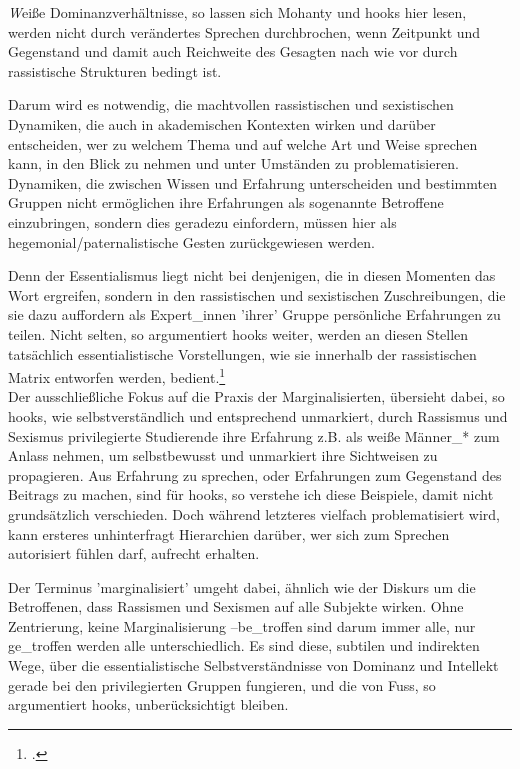 \textit{W}eiße Dominanzverhältnisse, so lassen sich Mohanty und hooks hier lesen, werden
nicht durch verändertes Sprechen durchbrochen, wenn Zeitpunkt und Gegenstand
und damit auch Reichweite des Gesagten nach wie vor durch rassistische
Strukturen bedingt ist.

Darum wird es notwendig, die machtvollen rassistischen und sexistischen
Dynamiken, die auch in akademischen Kontexten wirken und darüber entscheiden,
wer zu welchem Thema und auf welche Art und Weise sprechen kann, in den Blick
zu nehmen und unter Umständen zu problematisieren. Dynamiken, die zwischen
Wissen und Erfahrung unterscheiden und bestimmten Gruppen nicht ermöglichen
ihre Erfahrungen als sogenannte Betroffene einzubringen, sondern dies geradezu
einfordern, müssen hier als hegemonial/paternalistische Gesten zurückgewiesen
werden.

Denn der Essentialismus liegt nicht bei denjenigen, die in diesen Momenten das
Wort ergreifen, sondern in den rassistischen und sexistischen Zuschreibungen,
die sie dazu auffordern als Expert\_innen 'ihrer' Gruppe persönliche Erfahrungen
zu teilen. Nicht selten, so argumentiert hooks weiter, werden an diesen Stellen
tatsächlich essentialistische Vorstellungen, wie sie innerhalb der
rassistischen Matrix entworfen werden,
bedient.\footnotemark\footcitetext[81]{bellhooks}
\\

Der ausschließliche Fokus auf die Praxis der Marginalisierten, übersieht dabei,
so hooks, wie selbstverständlich und entsprechend unmarkiert, durch Rassismus
und Sexismus privilegierte Studierende ihre Erfahrung z.B. als weiße Männer\_*
zum Anlass nehmen, um selbstbewusst und unmarkiert ihre Sichtweisen zu
propagieren. Aus Erfahrung zu sprechen, oder Erfahrungen zum Gegenstand des
Beitrags zu machen, sind für hooks, so verstehe ich diese Beispiele, damit
nicht grundsätzlich verschieden. Doch während letzteres vielfach
problematisiert wird, kann ersteres unhinterfragt Hierarchien darüber, wer sich
zum Sprechen autorisiert fühlen darf, aufrecht
erhalten.\footnotemark{}

Der Terminus 'marginalisiert' umgeht dabei, ähnlich wie der Diskurs um die
Betroffenen, dass Rassismen und Sexismen auf alle Subjekte wirken. Ohne
Zentrierung, keine Marginalisierung –be\_troffen sind darum immer alle, nur
ge\_troffen werden alle unterschiedlich.  Es sind diese, subtilen und indirekten
Wege, über die essentialistische Selbstverständnisse von Dominanz und Intellekt
gerade bei den privilegierten Gruppen fungieren, und die von Fuss, so
argumentiert hooks, unberücksichtigt bleiben.
\\

